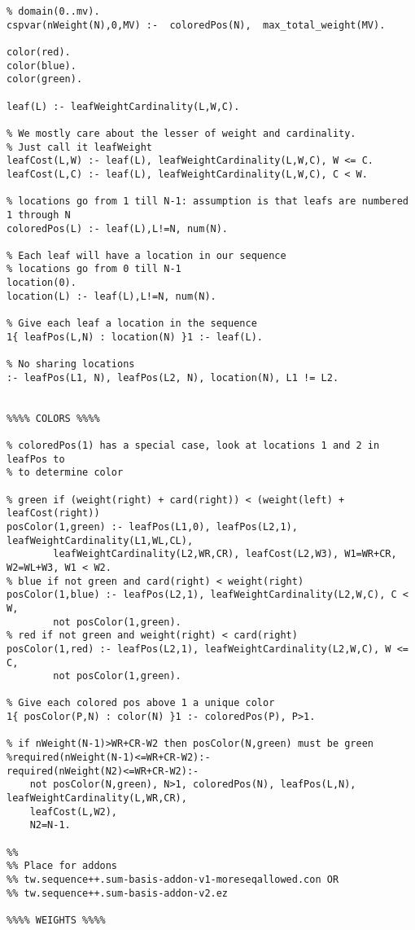 \documentclass[]{article}
\begin{document}
\begin{lstlisting}
% domain(0..mv).
cspvar(nWeight(N),0,MV) :-	coloredPos(N),	max_total_weight(MV).

color(red).
color(blue).
color(green).

leaf(L) :- leafWeightCardinality(L,W,C).

% We mostly care about the lesser of weight and cardinality.
% Just call it leafWeight
leafCost(L,W) :- leaf(L), leafWeightCardinality(L,W,C), W <= C.
leafCost(L,C) :- leaf(L), leafWeightCardinality(L,W,C), C < W.

% locations go from 1 till N-1: assumption is that leafs are numbered 1 through N
coloredPos(L) :- leaf(L),L!=N, num(N).

% Each leaf will have a location in our sequence
% locations go from 0 till N-1
location(0). 
location(L) :- leaf(L),L!=N, num(N).

% Give each leaf a location in the sequence
1{ leafPos(L,N) : location(N) }1 :- leaf(L).

% No sharing locations
:- leafPos(L1, N), leafPos(L2, N), location(N), L1 != L2.


%%%% COLORS %%%%

% coloredPos(1) has a special case, look at locations 1 and 2 in leafPos to
% to determine color

% green if (weight(right) + card(right)) < (weight(left) + leafCost(right))
posColor(1,green) :- leafPos(L1,0), leafPos(L2,1), leafWeightCardinality(L1,WL,CL),
		leafWeightCardinality(L2,WR,CR), leafCost(L2,W3), W1=WR+CR, W2=WL+W3, W1 < W2.
% blue if not green and card(right) < weight(right)
posColor(1,blue) :- leafPos(L2,1), leafWeightCardinality(L2,W,C), C < W, 
		not posColor(1,green).
% red if not green and weight(right) < card(right)
posColor(1,red) :- leafPos(L2,1), leafWeightCardinality(L2,W,C), W <= C, 
		not posColor(1,green).

% Give each colored pos above 1 a unique color
1{ posColor(P,N) : color(N) }1 :- coloredPos(P), P>1.

% if nWeight(N-1)>WR+CR-W2 then posColor(N,green) must be green
%required(nWeight(N-1)<=WR+CR-W2):- 
required(nWeight(N2)<=WR+CR-W2):- 
    not posColor(N,green), N>1, coloredPos(N), leafPos(L,N), leafWeightCardinality(L,WR,CR),
    leafCost(L,W2),
    N2=N-1.
		
%%
%% Place for addons
%% tw.sequence++.sum-basis-addon-v1-moreseqallowed.con OR
%% tw.sequence++.sum-basis-addon-v2.ez

%%%% WEIGHTS %%%%


\end{lstlisting}
\end{document}

